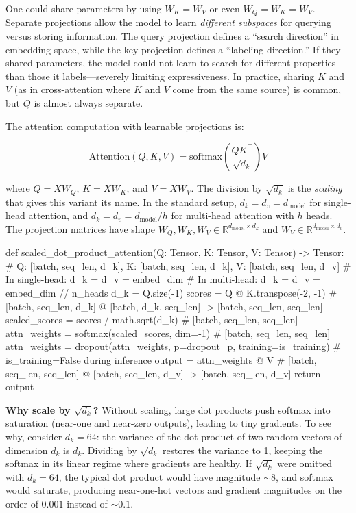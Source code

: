 \begin{keyconcept}
  One could share parameters by using $W_K = W_V$ or even $W_Q = W_K = W_V$.
  Separate projections allow the model to learn \emph{different subspaces} for
  querying versus storing information. The query projection defines a
  ``search direction'' in embedding space, while the key projection defines
  a ``labeling direction.'' If they shared parameters, the model could not
  learn to search for different properties than those it labels---severely
  limiting expressiveness. In practice, sharing $K$ and $V$ (as in
  cross-attention where $K$ and $V$ come from the same source) is common,
  but $Q$ is almost always separate.
\end{keyconcept}

The attention computation with learnable projections is:

\[
  \text{Attention}(Q, K, V) = \text{softmax}\!\left(\frac{QK^\top}{\sqrt{d_k}}\right)V
\]

where $Q = X W_Q$, $K = X W_K$, and $V = X W_V$. The division by $\sqrt{d_k}$
is the \emph{scaling} that gives this variant its name. In the standard setup,
$d_k = d_v = d_{\text{model}}$ for single-head attention, and $d_k = d_v =
d_{\text{model}} / h$ for multi-head attention with $h$ heads. The projection
matrices have shape $W_Q, W_K, W_V \in \mathbb{R}^{d_{\text{model}} \times d_k}$
and $W_V \in \mathbb{R}^{d_{\text{model}} \times d_v}$.

\begin{pseudocode}
def scaled_dot_product_attention(Q: Tensor, K: Tensor, V: Tensor) -> Tensor:
    # Q: [batch, seq_len, d_k], K: [batch, seq_len, d_k], V: [batch, seq_len, d_v]
    # In single-head: d_k = d_v = embed_dim
    # In multi-head: d_k = d_v = embed_dim // n_heads
    d_k = Q.size(-1)
    scores = Q @ K.transpose(-2, -1)  # [batch, seq_len, d_k] @ [batch, d_k, seq_len] -> [batch, seq_len, seq_len]
    scaled_scores = scores / math.sqrt(d_k)  # [batch, seq_len, seq_len]
    attn_weights = softmax(scaled_scores, dim=-1)  # [batch, seq_len, seq_len]
    attn_weights = dropout(attn_weights, p=dropout_p, training=is_training)  # is_training=False during inference
    output = attn_weights @ V  # [batch, seq_len, seq_len] @ [batch, seq_len, d_v] -> [batch, seq_len, d_v]
    return output
\end{pseudocode}

\begin{keyconcept}
  \textbf{Why scale by $\sqrt{d_k}$?} Without scaling, large
  dot products push softmax into saturation (near-one and near-zero
  outputs), leading to tiny gradients. To see why, consider $d_k = 64$:
  the variance of the dot product of two random vectors of dimension $d_k$
  is $d_k$. Dividing by $\sqrt{d_k}$ restores the variance to 1, keeping
  the softmax in its linear regime where gradients are healthy. If
  $\sqrt{d_k}$ were omitted with $d_k = 64$, the typical dot product would
  have magnitude $\sim\!8$, and softmax would saturate, producing
  near-one-hot vectors and gradient magnitudes on the order of $0.001$
  instead of $\sim\!0.1$.
\end{keyconcept}

